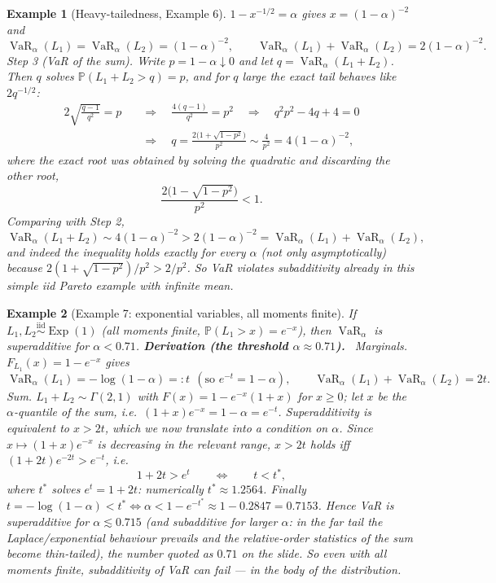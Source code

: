 \documentclass[11pt,a4paper]{article}
\newtheorem{example}{Example}
\newcommand{\VaR}{\operatorname{VaR}}
\newcommand{\Exp}{\operatorname{Exp}}
\renewcommand{\P}{\mathbb{P}}
\newcommand{\der}[1]{\medskip\noindent\textbf{Derivation (#1).}\ }
\begin{document}
\begin{example}[Heavy-tailedness, Example 6]
$1-x^{-1/2}=\alpha$ gives $x=(1-\alpha)^{-2}$ and
\[
  \VaR_\alpha(L_1)=\VaR_\alpha(L_2)=(1-\alpha)^{-2},\qquad
  \VaR_\alpha(L_1)+\VaR_\alpha(L_2)=2(1-\alpha)^{-2}.
\]
\emph{Step 3 (VaR of the sum).} Write $p=1-\alpha\downarrow0$ and let $q=\VaR_\alpha(L_1+L_2)$. Then
$q$ solves $\P(L_1+L_2>q)=p$, and for $q$ large the exact tail behaves like $2q^{-1/2}$:
\begin{align*}
  2\sqrt{\frac{q-1}{q^2}}=p
  &\quad\Longrightarrow\quad \frac{4(q-1)}{q^2}=p^2
  \quad\Longrightarrow\quad q^2p^2-4q+4=0\\
  &\quad\Longrightarrow\quad
  q=\frac{2\Big(1+\sqrt{1-p^2}\Big)}{p^2}\sim\frac{4}{p^2}=4(1-\alpha)^{-2},
\end{align*}
where the exact root was obtained by solving the quadratic and discarding the other root,
\[
  \frac{2\Big(1-\sqrt{1-p^2}\Big)}{p^2}<1 .
\]
Comparing with Step 2,
\[
  \VaR_\alpha(L_1+L_2)\sim 4(1-\alpha)^{-2}>2(1-\alpha)^{-2}
   =\VaR_\alpha(L_1)+\VaR_\alpha(L_2),
\]
and indeed the inequality holds exactly for every $\alpha$ (not only asymptotically) because
$2(1+\sqrt{1-p^2})/p^2>2/p^2$. So VaR violates subadditivity already in this simple iid Pareto
example with infinite mean.
\end{example}

\begin{example}[Example 7: exponential variables, all moments finite]\label{ex:exp}
If $L_1,L_2\stackrel{\text{iid}}{\sim}\Exp(1)$ (all moments finite, $\P(L_1>x)=e^{-x}$), then
$\VaR_\alpha$ is superadditive for $\alpha<0.71$.
\der{the threshold $\alpha\approx0.71$}
\emph{Marginals.} $F_{L_1}(x)=1-e^{-x}$ gives
\[
  \VaR_\alpha(L_1)=-\log(1-\alpha)=:t\ \ (\text{so } e^{-t}=1-\alpha),\qquad
  \VaR_\alpha(L_1)+\VaR_\alpha(L_2)=2t .
\]
\emph{Sum.} $L_1+L_2\sim\Gamma(2,1)$ with $F(x)=1-e^{-x}(1+x)$ for $x\ge0$; let $x$ be the
$\alpha$-quantile of the sum, i.e.\ $(1+x)e^{-x}=1-\alpha=e^{-t}$.
\emph{Superadditivity} is equivalent to $x>2t$, which we now translate into a condition on
$\alpha$. Since $x\mapsto(1+x)e^{-x}$ is decreasing in the relevant range, $x>2t$ holds iff
$(1+2t)e^{-2t}>e^{-t}$, i.e.
\[
  1+2t>e^{t}
  \qquad\Longleftrightarrow\qquad t<t^\ast,
\]
where $t^\ast$ solves $e^{t}=1+2t$: numerically $t^\ast\approx1.2564$. Finally
$t=-\log(1-\alpha)<t^\ast\iff \alpha<1-e^{-t^\ast}\approx 1-0.2847=0.7153$. Hence VaR is
superadditive for $\alpha\lesssim0.715$ (and subadditive for larger $\alpha$: in the far tail the
Laplace/exponential behaviour prevails and the relative-order statistics of the sum become
thin-tailed), the number quoted as $0.71$ on the slide. So even with all moments finite,
subadditivity of VaR can fail --- in the body of the distribution.
\end{example}
\end{document}
